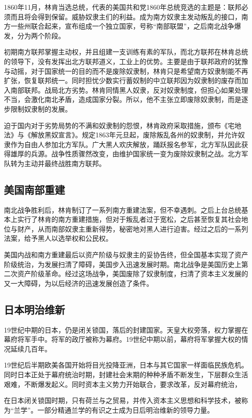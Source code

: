 1860年11月，林肯当选总统，代表的美国共和党1860年总统竞选的主题是：联邦必须而且将会得到保留。威胁奴隶主们的利益。成为南方奴隶主发动叛乱的接口，南方一些州联合起来，宣布组成一个独立国家，号称“南部联盟”，之后南北战争爆发，分为两个阶段。

初期南方联邦掌握主动权，并且组建一支训练有素的军队，而北方联邦在林肯总统的领导下，没有发挥出北方联邦道义，工业上的优势。主要是由于联邦政府的犹豫与动摇，对于国家统一的目的而不是废除奴隶制，林肯只是希望南方奴隶制能不再扩张，恢复联邦统一。同时担忧少数实行蓄奴制的中立联邦因为奴隶制的废存而加入南部联邦。战局北方劣势。林肯同情黑人奴隶，反对奴隶制度，但担心如果处理不当，会激化南北矛盾，造成国家分裂。所以，他不主张立即废除奴隶制，而是逐步限制奴隶制的发展。

迫于国内对于劣势局势的不满和奴隶制的怨恨，林肯政府采取措施，颁布《宅地法》与《解放黑奴宣言》。规定1863年元旦起，废除叛乱各州的奴隶制，并允许奴隶作为自由人参加北方军队。广大黑人欢庆解放，踊跃报名参军，北方军队因此获得雄厚的兵源。战争性质骤然改变，由维护国家统一变为废除奴隶制之战。北方军队转为主动并最终战胜南方联邦。

\subsection{美国南部重建}
南北战争胜利后，林肯制订了一系列南方重建法案，但不幸遇刺。之后上台总统基本上实行了林肯的南方重建措施，但对于叛乱者过于宽松，之后甚至恢复其社会地位与财产，从而南部奴隶主重新得势，秘密地对黑人进行迫害。经过之后的一系列法案，给予黑人以选举权和公民权。

美国内战和南方重建最后以资产阶级与奴隶主的妥协告终，但全国基本实现了资产阶级统治，为发展扫清了障碍，美国步入迅速发展时期。南北战争是美国历史上第二次资产阶级革命。经过这场战争，美国废除了奴隶制度，扫清了资本主义发展的又一大障碍，为以后经济的迅速发展创造了条件。

\subsection{日本明治维新}
19世纪中期的日本，仍是闭关锁国，落后的封建国家。天皇大权旁落，权力掌握在幕府将军手中。将军的政厅被称为幕府。19世纪中期以前，幕府将军掌握大权的情况延续几百年。

19世纪后半期欧美各国开始将目光投降亚洲，日本与其它国家一样面临民族危机。同时日本正处于幕府统治时期，封建社会末期的种种矛盾不断发生，下层群众生活艰难，不断爆发起义。同时资本主义势力开始联合，要求改革，反对幕府统治，

在日本闭关锁国时期，只有荷兰与之贸易，并传入资本主义思想和科学技术，被称为“兰学”。一部分精通兰学的有识之士成为日后明治维新的领导力量。

